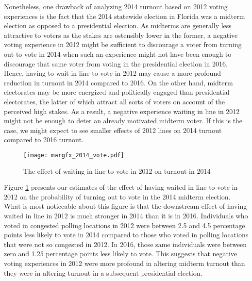 \documentclass[12pt,titlepage]{article}
\begin{document}
Nonetheless, one drawback of analyzing 2014 turnout based on 2012
voting experiences is the fact that the 2014 statewide election in
Florida was a midterm election as opposed to a presidential election.
As midterms are generally less attractive to voters as the stakes are
ostensibly lower in the former, a negative voting experience in 2012
might be sufficient to discourage a voter from turning out to vote in
2014 when such an experience might not have been enough to discourage
that same voter from voting in the presidential election in 2016.
Hence, having to wait in line to vote in 2012 may cause a more
profound reduction in turnout in 2014 compared to 2016.  On the other
hand, midterm electorates may be more energized and politically
engaged than presidential electorates, the latter of which attract all
sorts of voters on account of the perceived high stakes.  As a result,
a negative experience waiting in line in 2012 might not be enough to
deter an already motivated midterm voter.  If this is the case, we
might expect to see smaller effects of 2012 lines on 2014 turnout
compared to 2016 turnout.




\begin{figure}[!ht]
  \caption{The effect of waiting in line to vote in 2012 on turnout in 2014}
  \centering\texttt{[image: margfx\_2014\_vote.pdf]}
  \label{fig:prvoting2014}
\end{figure}

Figure \ref{fig:prvoting2014} presents our estimates of the effect of
having waited in line to vote in 2012 on the probability of turning
out to vote in the 2014 midterm election.  What is most noticeable
about this figure is that the downstream effect of having waited in
line in 2012 is much stronger in 2014 than it is in 2016.  Individuals
who voted in congested polling locations in 2012 were between 2.5 and
4.5 percentage points less likely to vote in 2014 compared to those
who voted in polling locations that were not so congested in 2012.  In
2016, those same individuals were between zero and 1.25 percentage
points less likely to vote.  This suggests that negative voting
experiences in 2012 were more profound in altering midterm turnout
than they were in altering turnout in a subsequent presidential
election.
\end{document}
